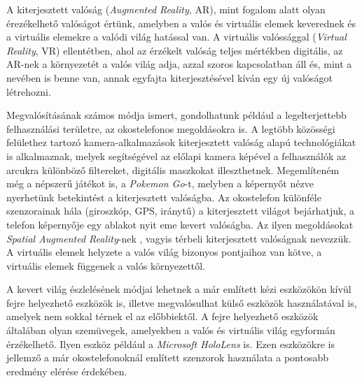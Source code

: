 


A kiterjesztett valóság (\textit{Augmented Reality}, AR), mint fogalom alatt olyan érezékelhető valóságot értünk, amelyben a valós és virtuális elemek keverednek és a virtuális elemekre a valódi világ hatással van. A virtuális valóssággal (\textit{Virtual Reality}, VR) ellentétben, ahol az érzékelt valóság teljes mértékben digitális, az AR-nek a környezetét a valós világ adja, azzal szoros kapcsolatban áll és, mint a nevében is benne van, annak egyfajta kiterjesztésével kíván egy új valóságot létrehozni.

Megvalósításának számos módja ismert, gondolhatunk például a legelterjettebb felhasználási területre, az okostelefonos megoldásokra is. A legtöbb közösségi felülethez tartozó kamera-alkalmazások kiterjesztett valóság alapú technológiákat is alkalmaznak, melyek segítségével az előlapi kamera képével a felhasználók az arcukra különböző filtereket, digitális maszkokat illeszthetnek. Megemlíteném még a népszerű játékot is, a \textit{Pokemon Go}-t, melyben a képernyőt nézve nyerhetünk betekintést a kiterjesztett valóságba. Az okostelefon különféle szenzorainak hála (giroszkóp, GPS, iránytű) a kiterjesztett világot bejárhatjuk, a telefon képernyője egy ablakot nyit eme kevert valóságba. Az ilyen megoldásokat \textit{Spatial Augmented Reality}-nek \cite{bimber2005spatial}, vagyis térbeli kiterjesztett valóságnak nevezzük. A virtuális elemek helyzete a valós világ bizonyos pontjaihoz van kötve, a virtuális elemek függenek a valós környezettől.

A kevert világ észlelésének módjai lehetnek a már említett kézi eszközökön kívül fejre helyezhető eszközök is, illetve megvalósulhat külső eszközök használatával is, amelyek nem sokkal térnek el az előbbiektől.
A fejre helyezhető eszközök általában olyan szemüvegek, amelyekben a valós és virtuális világ egyformán érzékelhető. Ilyen eszköz például a \textit{Microsoft HoloLens} is. Ezen eszközökre is jellemző a már okostelefonoknál említett szenzorok használata a pontosabb eredmény elérése érdekében.

